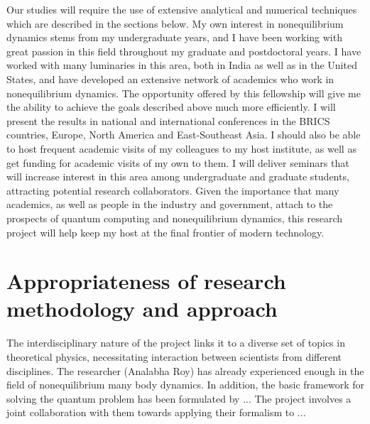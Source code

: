 \documentclass[a4paper,11pt,color]{article}
\begin{document}
Our studies will require the use of extensive analytical and numerical techniques which are described in the sections below. My own interest in nonequilibrium dynamics stems from my undergraduate years, and I have been working with great passion in this field throughout my graduate and postdoctoral years. I have worked with many luminaries in this area, both in India as well as in the United States, and have developed an extensive network of academics who work in nonequilibrium dynamics. The opportunity offered by this fellowship will give me the ability to achieve the goals described above much more efficiently. I will present the results in national and international conferences in the BRICS countries, Europe, North America and East-Southeast Asia. I should also be able to host frequent academic visits of my colleagues to my host institute, as well as get funding for academic visits of my own to them. I will deliver seminars that will increase interest in this area among undergraduate and graduate students, attracting potential research collaborators.  Given the importance that many academics, as well as people in the industry and government, attach to the prospects of quantum computing and nonequilibrium dynamics, this research project will help keep my host at the final frontier of modern technology.
 
\section{Appropriateness of research methodology and approach}
\label{sec:research_methodology}

The interdisciplinary nature of the project links it to  a diverse set of topics in theoretical physics, necessitating interaction between scientists from different disciplines. The researcher (Analabha Roy) has already experienced enough in the field of nonequilibrium many body dynamics. In addition, the basic framework for solving the quantum problem has been formulated by ...
The project involves a joint collaboration with them towards applying their formalism to ...
\end{document}
